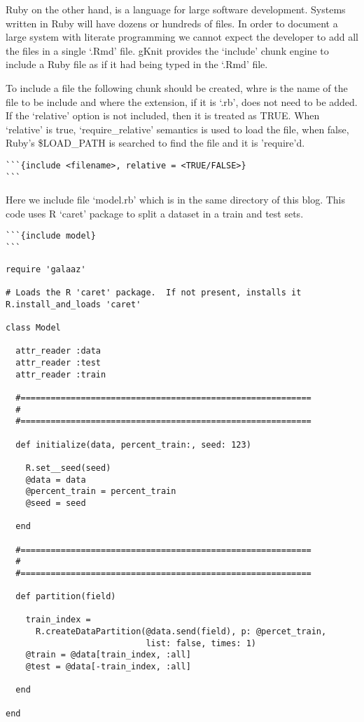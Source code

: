 \documentclass[]{article}
\begin{document}
Ruby on the other hand, is a language for large software development.
Systems written in Ruby will have dozens or hundreds of files. In order
to document a large system with literate programming we cannot expect
the developer to add all the files in a single `.Rmd' file. gKnit
provides the `include' chunk engine to include a Ruby file as if it had
being typed in the `.Rmd' file.

To include a file the following chunk should be created, whre is the
name of the file to be include and where the extension, if it is `.rb',
does not need to be added. If the `relative' option is not included,
then it is treated as TRUE. When `relative' is true, `require\_relative'
semantics is used to load the file, when false, Ruby's \$LOAD\_PATH is
searched to find the file and it is 'require'd.

\begin{verbatim}
```{include <filename>, relative = <TRUE/FALSE>}
```
\end{verbatim}

Here we include file `model.rb' which is in the same directory of this
blog. This code uses R `caret' package to split a dataset in a train and
test sets.

\begin{verbatim}
```{include model}
```
\end{verbatim}

\begin{verbatim}
require 'galaaz'

# Loads the R 'caret' package.  If not present, installs it 
R.install_and_loads 'caret'

class Model
  
  attr_reader :data
  attr_reader :test
  attr_reader :train

  #==========================================================
  #
  #==========================================================
  
  def initialize(data, percent_train:, seed: 123)

    R.set__seed(seed)
    @data = data
    @percent_train = percent_train
    @seed = seed
    
  end

  #==========================================================
  #
  #==========================================================

  def partition(field)

    train_index =
      R.createDataPartition(@data.send(field), p: @percet_train,
                            list: false, times: 1)
    @train = @data[train_index, :all]
    @test = @data[-train_index, :all]
    
  end
  
end
\end{verbatim}
\end{document}
